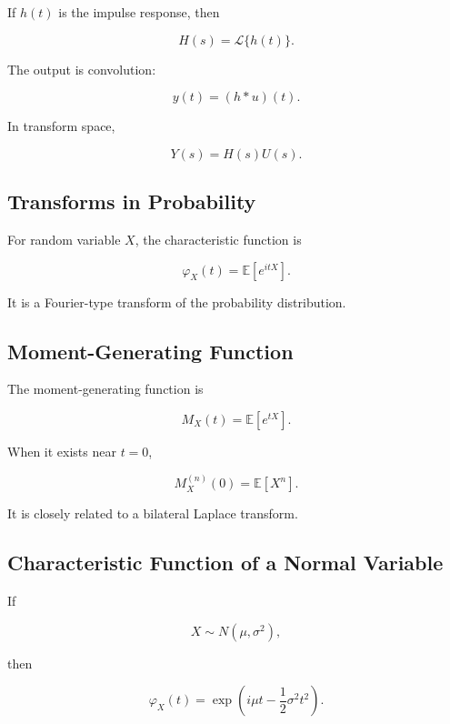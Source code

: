 If \(h(t)\) is the impulse response, then

\[
\boxed{
H(s)
=
\mathcal{L}\{h(t)\}.
}
\]

The output is convolution:

\[
\boxed{
y(t)
=
(h*u)(t).
}
\]

In transform space,

\[
\boxed{
Y(s)
=
H(s)U(s).
}
\]

\subsection{Transforms in Probability}
\label{subsec:transforms-probability-reference}

For random variable \(X\), the characteristic function is

\[
\boxed{
\varphi_X(t)
=
\mathbb{E}
[
e^{itX}
].
}
\]

It is a Fourier-type transform of the probability distribution.

\subsection{Moment-Generating Function}
\label{subsec:moment-generating-transform-reference}

The moment-generating function is

\[
\boxed{
M_X(t)
=
\mathbb{E}
[
e^{tX}
].
}
\]

When it exists near \(t=0\),

\[
\boxed{
M_X^{(n)}(0)
=
\mathbb{E}[X^n].
}
\]

It is closely related to a bilateral Laplace transform.

\subsection{Characteristic Function of a Normal Variable}
\label{subsec:normal-characteristic-function}

If

\[
X\sim N(\mu,\sigma^2),
\]

then

\[
\boxed{
\varphi_X(t)
=
\exp
\left(
i\mu t
-
\frac12\sigma^2t^2
\right).
}
\]

